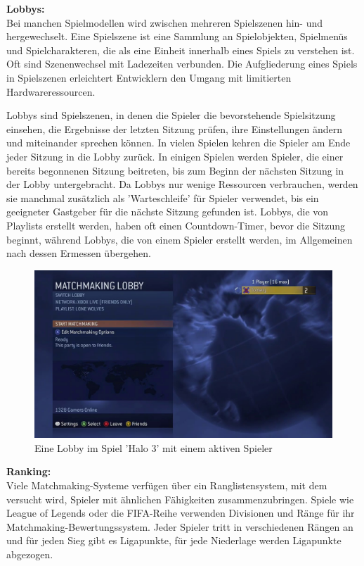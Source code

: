 \textbf{Lobbys:} \\
Bei manchen Spielmodellen wird zwischen mehreren Spielszenen hin- und hergewechselt. Eine Spielszene ist eine Sammlung an Spielobjekten, Spielmenüs und Spielcharakteren, die als eine Einheit innerhalb eines Spiels zu verstehen ist. Oft sind Szenenwechsel mit Ladezeiten verbunden. Die Aufgliederung eines Spiels in Spielszenen erleichtert Entwicklern den Umgang mit limitierten Hardwareressourcen. \cite{Wikipedia.2012}

Lobbys sind Spielszenen, in denen die Spieler die bevorstehende Spielsitzung einsehen, die Ergebnisse der letzten Sitzung prüfen, ihre Einstellungen ändern und miteinander sprechen können. In vielen Spielen kehren die Spieler am Ende jeder Sitzung in die Lobby zurück. In einigen Spielen werden Spieler, die einer bereits begonnenen Sitzung beitreten, bis zum Beginn der nächsten Sitzung in der Lobby untergebracht. Da Lobbys nur wenige Ressourcen verbrauchen, werden sie manchmal zusätzlich als 'Warteschleife' für Spieler verwendet, bis ein geeigneter Gastgeber für die nächste Sitzung gefunden ist. Lobbys, die von Playlists erstellt werden, haben oft einen Countdown-Timer, bevor die Sitzung beginnt, während Lobbys, die von einem Spieler erstellt werden, im Allgemeinen nach dessen Ermessen übergehen.

\begin{figure}[H]
	\centering
	\includegraphics[width=120mm]{images/halo3_lobby.jpg}
	\caption['Halo 3' Lobby]{Eine Lobby im Spiel 'Halo 3' mit einem aktiven Spieler}
	\label{pic:Dota2_Party_Invite}
\end{figure}

\cite{Wikipedia.2021b}

\textbf{Ranking:} \\
Viele Matchmaking-Systeme verfügen über ein Ranglistensystem, mit dem versucht wird, Spieler mit ähnlichen Fähigkeiten zusammenzubringen. Spiele wie League of Legends oder die FIFA-Reihe verwenden Divisionen und Ränge für ihr Matchmaking-Bewertungssystem. Jeder Spieler tritt in verschiedenen Rängen an und für jeden Sieg gibt es Ligapunkte, für jede Niederlage werden Ligapunkte abgezogen.

